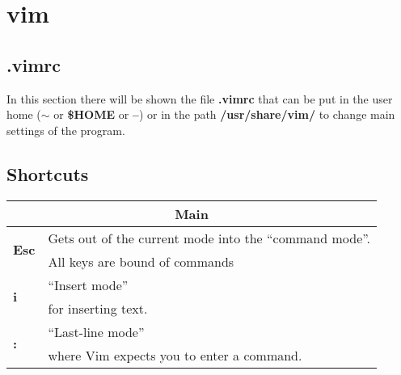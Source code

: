 \section{vim}
\subsection{.vimrc}
In this section there will be shown the file \textbf{.vimrc} that can be put in the user home (\textbf{$\sim$} or \textbf{\$HOME} or \textbf{--}) or in the path \textbf{/usr/share/vim/} to change main settings of the program.



\subsection{Shortcuts}

\begin{table}[h]
\centering
\footnotesize
\begin{tabular}{|l|l|}
\multicolumn{2}{c}{\textbf{Main}}\\
\hline
\multirow{2}{*}{\textbf{Esc}} & {Gets out of the current mode into the “command mode”.}\\
& {All keys are bound of commands}\\
\hline
\multirow{2}{*}{\textbf{i}} & {“Insert mode”}\\
& {for inserting text.}\\ 
\hline
\multirow{2}{*}{\textbf{:}} & {“Last-line mode”}\\ 
& {where Vim expects you to enter a command.}\\ 
\hline
\end{tabular}
\end{table}


